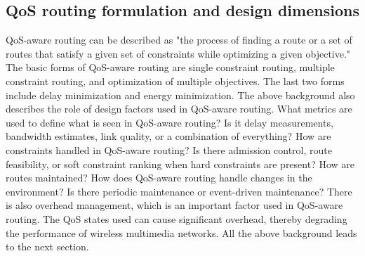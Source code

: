 \documentclass[12pt]{article}
\begin{document}
    \subsection{QoS routing formulation and design dimensions}
    QoS-aware routing can be described as "the process of finding a route or a set of routes that satisfy a given set of constraints while optimizing a given objective." The basic forms of QoS-aware routing are single constraint routing, multiple constraint routing, and optimization of multiple objectives. The last two forms include delay minimization and energy minimization. The above background also describes the role of design factors used in QoS-aware routing. What metrics are used to define what is seen in QoS-aware routing? Is it delay measurements, bandwidth estimates, link quality, or a combination of everything? How are constraints handled in QoS-aware routing? Is there admission control, route feasibility, or soft constraint ranking when hard constraints are present? How are routes maintained? How does QoS-aware routing handle changes in the environment? Is there periodic maintenance or event-driven maintenance? There is also overhead management, which is an important factor used in QoS-aware routing. The QoS states used can cause significant overhead, thereby degrading the performance of wireless multimedia networks. All the above background leads to the next section.
\end{document}
